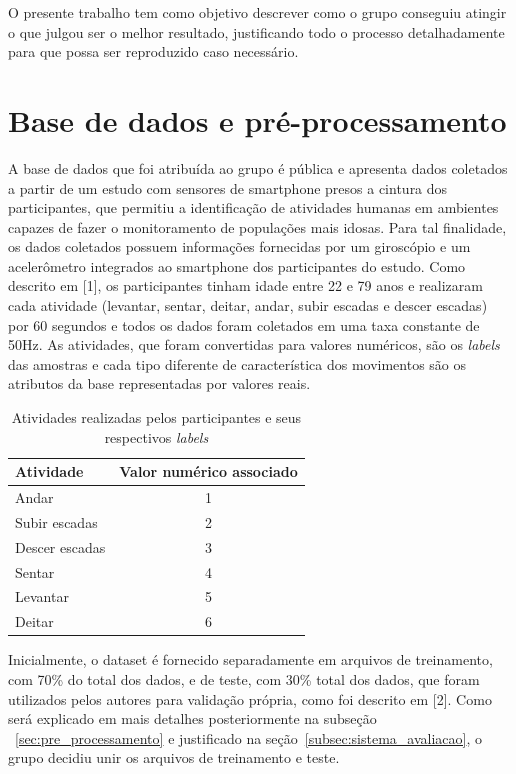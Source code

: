 \documentclass[10pt, conference, compsocconf]{IEEEtran}
\begin{document}
O presente trabalho tem como objetivo descrever como o grupo conseguiu atingir o
que julgou ser o melhor resultado, justificando todo o processo detalhadamente
para que possa ser reproduzido caso necessário. 


\section{Base de dados e pré-processamento}\label{sec:base_dados}
A base de dados que foi atribuída ao grupo é pública e apresenta dados coletados 
a partir de um estudo com sensores de smartphone presos a cintura dos
participantes, que permitiu a identificação de atividades humanas em ambientes 
capazes de fazer o monitoramento de populações mais idosas. 
Para tal finalidade, os dados coletados possuem informações fornecidas por um 
giroscópio e um acelerômetro integrados ao smartphone dos participantes do estudo. 
Como descrito em [1], os participantes tinham idade entre 22 e 79 anos e 
realizaram cada atividade (levantar, sentar, deitar, andar, subir escadas e 
descer escadas) por 60 segundos e todos os dados foram coletados em uma taxa 
constante de 50Hz. As atividades, que foram convertidas para valores numéricos, 
são os \textsl{labels} das amostras e cada tipo diferente de característica 
dos movimentos são os atributos da base representadas por valores reais.\newline

\begin{table}[h]
\begin{center}
    \caption{Atividades realizadas pelos participantes e seus respectivos
    \textsl{labels}}\label{tab:labels}
    \begin{tabular}{| l | c |}
        \hline
        Atividade & Valor numérico associado\\
        \hline
        Andar & 1\\
        Subir escadas & 2\\
        Descer escadas & 3\\
        Sentar & 4\\
        Levantar & 5\\
        Deitar & 6\\
        \hline
    \end{tabular}
\end{center}
\end{table}

Inicialmente, o dataset é fornecido separadamente em arquivos de 
treinamento, com 70\% do total dos dados, e de teste, com 30\% total dos dados, 
que foram utilizados pelos autores para validação própria, como foi descrito em 
[2]. Como será explicado em mais detalhes posteriormente na subseção
~\ref{sec:pre_processamento} e justificado na
seção~\ref{subsec:sistema_avaliacao}, o grupo decidiu unir os arquivos de treinamento e teste. 
\end{document}
